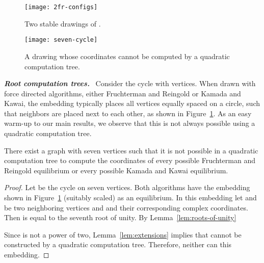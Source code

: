 \documentclass[oribibl,10pt]{llncs}
\newcommand{\Emph}[1]{\smallskip\textbf{\textit{#1}}~}
\begin{document}
\begin{figure}[tb]
\begin{minipage}[t]{0.4\textwidth} 
\centering
\texttt{[image: 2fr-configs]}
\caption{Two stable drawings of .}
\label{fig:2fr-configs}
\end{minipage}\hfill
\begin{minipage}[t]{0.4\textwidth} 
\centering
\texttt{[image: seven-cycle]}
\caption{A drawing whose coordinates cannot be computed by a quadratic computation tree.}
\label{fig:seven-cycle}
\end{minipage}
\end{figure}

\Emph{Root computation trees.}
Consider the cycle  with  vertices. When drawn with force directed algorithms, either Fruchterman and Reingold or Kamada and Kawai, the embedding typically places all vertices equally spaced on a circle, such that neighbors are placed next to each other, as shown in Figure~\ref{fig:seven-cycle}. As an easy warm-up to our main results, we observe that this is not always possible using a quadratic computation tree.

\begin{theorem}\label{thm:force-quad}
There exist a graph with seven vertices such that it is not possible in a quadratic computation tree to compute the coordinates of every possible Fruchterman and Reingold equilibrium or
every possible Kamada and Kawai equilibrium.
\end{theorem}
\begin{proof}
Let  be the cycle  on seven vertices. Both algorithms have the embedding shown in Figure~\ref{fig:seven-cycle} (suitably scaled) as an equilibrium. In this embedding let  and  be two neighboring vertices and  and  their corresponding complex coordinates. Then  is equal to  the seventh root of unity. By Lemma~\ref{lem:roots-of-unity}

Since  is not a power of two, Lemma~\ref{lem:extensions} implies that  cannot be constructed by a quadratic computation tree. Therefore, neither can this embedding.
\end{proof}
\end{document}
